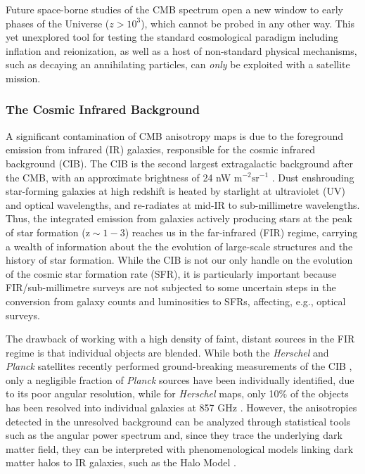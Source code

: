 Future space-borne studies of the CMB spectrum open a new window to early phases of the Universe ($z > 10^3$), 
which cannot be probed in any other way. This yet unexplored tool for testing the standard cosmological paradigm 
including inflation and reionization, 
as well as a host of non-standard physical mechanisms, such as decaying an annihilating particles, 
can {\it only} be exploited with a satellite mission. 


\vspace{-0.15in}
\subsubsection{The Cosmic Infrared Background}
\vspace{-0.05in}
A significant contamination of CMB anisotropy maps is due to
the foreground emission from infrared (IR)
galaxies, responsible for the cosmic infrared background (CIB).
The CIB is the second largest
extragalactic background after the CMB, with an approximate
brightness of 24 nW m$\mathrm{^{-2} sr^{-1}}$ \citep{dole2006}.
Dust enshrouding star-forming galaxies at high redshift
is heated by starlight at ultraviolet (UV) and optical wavelengths,
and re-radiates at mid-IR to sub-millimetre wavelengths.
Thus, the integrated emission from galaxies actively
producing stars at the peak of star formation
($\mathrm{z\sim 1-3}$) reaches us in the far-infrared (FIR) regime,
carrying a wealth of information about the the evolution of
large-scale structures and the history of star formation.
While the CIB is not our only handle on the evolution of the
cosmic star formation rate (SFR), it is particularly important
because FIR/sub-millimetre surveys are not subjected to some
uncertain steps in the conversion from galaxy counts and luminosities to SFRs,
affecting, e.g., optical surveys.

The drawback of working with a
high density of faint, distant sources in the FIR regime is that
individual objects are blended. While both the {\it Herschel} and {\it Planck} satellites
recently performed ground-breaking measurements of the CIB
\citep{amblard2011,viero2013a,planck2014-XXX,mak2016}, only a
negligible fraction of {\it Planck} sources have been individually
identified, due to its poor angular resolution, while for
{\it Herschel} maps, only 10$\%$ of the objects
has been resolved into individual galaxies at 857 GHz \cite{bethermin2010}.
However, the anisotropies detected in the
unresolved background can be analyzed through statistical tools
such as the angular power spectrum \citep{knox2001} and, since they trace the
underlying dark matter field, they can be interpreted with
phenomenological models linking dark matter halos to IR galaxies,
such as the Halo Model \cite{cooray2002,shang2012}.

